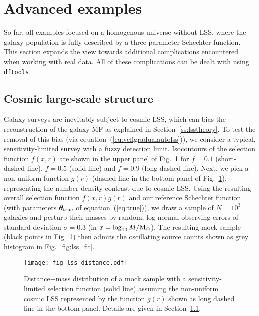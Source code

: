 \documentclass[a4paper,fleqn,usenatbib]{mnras}
\newcommand{\msun}{{\rm M}_{\odot}}
\newcommand{\dftools}{\texttt{dftools}\xspace}
\newcommand{\fig}[1]{Fig.~\ref{fig:#1}}
\newcommand{\eq}[1]{equation~(\ref{eq:#1})}
\renewcommand{\ss}[1]{Section~\ref{ss:#1}}
\newcommand{\para}{{\bm{\theta}}}
\begin{document}
\section{Advanced examples}\label{s:advanced}

So far, all examples focused on a homogenous universe without LSS, where the galaxy population is fully described by a three-parameter Schechter function. This section expands the view towards additional complications encountered when working with real data. All of these complications can be dealt with using \dftools.

\subsection{Cosmic large-scale structure}\label{ss:lssexample}

Galaxy surveys are inevitably subject to cosmic LSS, which can bias the reconstruction of the galaxy MF as explained in \ss{lsstheory}. To test the removal of this bias (via \eq{veffgradualautolss}), we consider a typical, sensitivity-limited survey with a fuzzy detection limit. Isocontours of the selection function $f(x,r)$ are shown in the upper panel of \fig{lss_distance} for $f=0.1$ (short-dashed line), $f=0.5$ (solid line) and $f=0.9$ (long-dashed line). Next, we pick a non-uniform function $g(r)$ (dashed line in the bottom panel of \fig{lss_distance}), representing the number density contrast due to cosmic LSS. Using the resulting overall selection function $f(x,r)g(r)$ and our reference Schechter function (with parameters $\para_{\rm true}$ of \eq{true}), we draw a sample of $N=10^3$ galaxies and perturb their masses by random, log-normal observing errors of standard deviation $\sigma=0.3$ (in $x=\log_{10}M/\msun$). The resulting mock sample (black points in \fig{lss_distance}) then admits the oscillating source counts shown as grey histogram in \fig{lss_fit}.

\begin{figure}
\begin{center}
\texttt{[image: fig\_lss\_distance.pdf]}
\caption{Distance$-$mass distribution of a mock sample with a sensitivity-limited selection function (solid line) assuming the non-uniform cosmic LSS represented by the function $g(r)$ shown as long dashed line in the bottom panel. Details are given in \ss{lssexample}.}\label{fig:lss_distance}
\end{center}
\end{figure}
\end{document}
